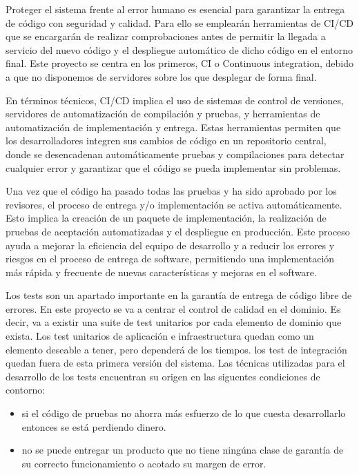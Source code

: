 
Proteger el sistema frente al error humano es esencial para garantizar la entrega de código con seguridad y calidad. Para ello se emplearán herramientas de \gls{CI/CD} que se encargarán de realizar comprobaciones antes de permitir la llegada a servicio del nuevo código y el despliegue automático de dicho código en el entorno final. Este proyecto se centra en los primeros, CI o Continuous integration, debido a que no disponemos de servidores sobre los que desplegar de forma final.

En términos técnicos, CI/CD implica el uso de sistemas de control de versiones, servidores de automatización de compilación y pruebas, y herramientas de automatización de implementación y entrega. Estas herramientas permiten que los desarrolladores integren sus cambios de código en un repositorio central, donde se desencadenan automáticamente pruebas y compilaciones para detectar cualquier error y garantizar que el código se pueda implementar sin problemas.

Una vez que el código ha pasado todas las pruebas y ha sido aprobado por los revisores, el proceso de entrega y/o implementación se activa automáticamente. Esto implica la creación de un paquete de implementación, la realización de pruebas de aceptación automatizadas y el despliegue en producción. Este proceso ayuda a mejorar la eficiencia del equipo de desarrollo y a reducir los errores y riesgos en el proceso de entrega de software, permitiendo una implementación más rápida y frecuente de nuevas características y mejoras en el software.

Los tests son un apartado importante en la garantía de entrega de código libre de errores. En este proyecto se va a centrar el control de calidad en el dominio. Es decir, va a existir una suite de test unitarios por cada elemento de dominio que exista. Los test unitarios de aplicación e infraestructura quedan como un elemento deseable a tener, pero dependerá de los tiempos. los test de integración quedan fuera de esta primera versión del sistema. Las técnicas utilizadas para el desarrollo de los tests encuentran su origen en las siguentes condiciones de contorno:

\begin{itemize}
    \item si el código de pruebas no ahorra más esfuerzo de lo que cuesta desarrollarlo entonces se está perdiendo dinero.
    \item no se puede entregar un producto que no tiene ningúna clase de garantía de su correcto funcionamiento o acotado su margen de error.
\end{itemize}

